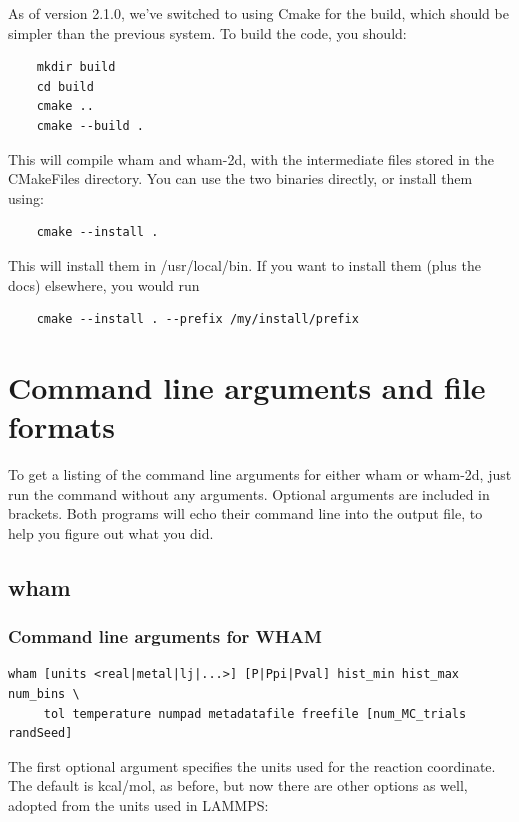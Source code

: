 \documentclass[12pt]{article}
\begin{document}
As of version 2.1.0, we've switched to using Cmake for the build, which should
be simpler than the previous system. To build the code, you should:

\begin{verbatim}
    mkdir build
    cd build
    cmake ..
    cmake --build .
\end{verbatim}

This will compile wham and wham-2d, with the intermediate files stored in the
CMakeFiles directory. You can use the two binaries directly, or install them
using:

\begin{verbatim}
    cmake --install .
\end{verbatim}

This will install them in /usr/local/bin. If you want to install them (plus the
docs) elsewhere, you would run


\begin{verbatim}
    cmake --install . --prefix /my/install/prefix
\end{verbatim}

\section{Command line arguments and file formats}

To get a listing of the command line arguments for either wham or wham-2d,
just run the command without any arguments.  Optional arguments are
included in brackets.  Both programs will echo their command line into the
output file, to help you figure out what you did.

\subsection{wham}

\subsubsection{Command line arguments for WHAM}

\begin{verbatim}
wham [units <real|metal|lj|...>] [P|Ppi|Pval] hist_min hist_max num_bins \ 
     tol temperature numpad metadatafile freefile [num_MC_trials randSeed]
\end{verbatim}

The first optional argument specifies the units used for the reaction
coordinate. The default is kcal/mol, as before, but now there are other options
as well, adopted from the units used in LAMMPS:
\end{document}
